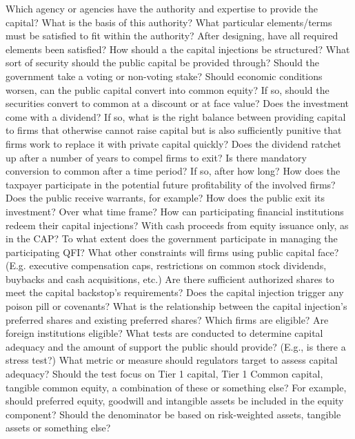 \documentclass[12pt]{article}
\begin{document}
\begin{outline}[enumerate]

\1 Which agency or agencies have the authority and expertise to provide the capital?
\2 What is the basis of this authority?
\2 What particular elements/terms must be satisfied to fit within the authority?
\2 After designing, have all required elements been satisfied?
\1 How should a the capital injections be structured?
\2 What sort of security should the public capital be provided through?
\2 Should the government take a voting or non-voting stake?
\2 Should economic conditions worsen, can the public capital convert into common equity?
\3 If so, should the securities convert to common at a discount or at face value?
\2 Does the investment come with a dividend? If so, what is the right balance between providing capital to firms that otherwise cannot raise capital but is also sufficiently punitive that firms work to replace it with private capital quickly?
\2 Does the dividend ratchet up after a number of years to compel firms to exit?
\2 Is there mandatory conversion to common after a time period? If so, after how long?
\2 How does the taxpayer participate in the potential future profitability of the involved firms? Does the public receive warrants, for example?
\2 How does the public exit its investment? Over what time frame? 
\2 How can participating financial institutions redeem their capital injections? With cash proceeds from equity issuance only, as in the CAP? 
\1 To what extent does the government participate in managing the participating QFI?
\2 What other constraints will firms using public capital face? (E.g. executive compensation caps, restrictions on common stock dividends, buybacks and cash acquisitions, etc.)
\2 Are there sufficient authorized shares to meet the capital backstop's requirements?
\2 Does the capital injection trigger any poison pill or covenants?
\2 What is the relationship between the capital injection's preferred shares and existing preferred shares? 
\1 Which firms are eligible? 
\2 Are foreign institutions eligible?
\2 What tests are conducted to determine capital adequacy and the amount of support the public should provide? (E.g., is there a stress test?)
\2 What metric or measure should regulators target to assess capital adequacy?
\3 Should the test focus on Tier 1 capital, Tier 1 Common capital, tangible common equity, a combination of these or something else?
\4 For example, should preferred equity, goodwill and intangible assets be included in the equity component?
\4 Should the denominator be based on risk-weighted assets, tangible assets or something else?

\end{outline}
\end{document}
